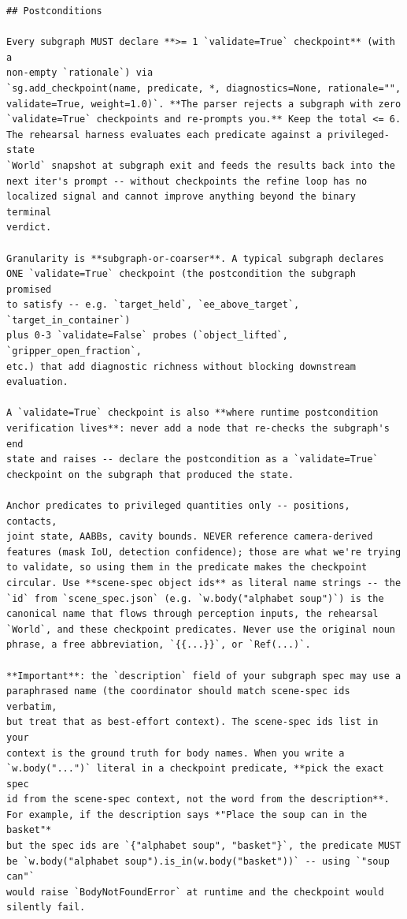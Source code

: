 \begin{lstlisting}
## Postconditions

Every subgraph MUST declare **>= 1 `validate=True` checkpoint** (with a
non-empty `rationale`) via
`sg.add_checkpoint(name, predicate, *, diagnostics=None, rationale="",
validate=True, weight=1.0)`. **The parser rejects a subgraph with zero
`validate=True` checkpoints and re-prompts you.** Keep the total <= 6.
The rehearsal harness evaluates each predicate against a privileged-state
`World` snapshot at subgraph exit and feeds the results back into the
next iter's prompt -- without checkpoints the refine loop has no
localized signal and cannot improve anything beyond the binary terminal
verdict.

Granularity is **subgraph-or-coarser**. A typical subgraph declares
ONE `validate=True` checkpoint (the postcondition the subgraph promised
to satisfy -- e.g. `target_held`, `ee_above_target`, `target_in_container`)
plus 0-3 `validate=False` probes (`object_lifted`, `gripper_open_fraction`,
etc.) that add diagnostic richness without blocking downstream evaluation.

A `validate=True` checkpoint is also **where runtime postcondition
verification lives**: never add a node that re-checks the subgraph's end
state and raises -- declare the postcondition as a `validate=True`
checkpoint on the subgraph that produced the state.

Anchor predicates to privileged quantities only -- positions, contacts,
joint state, AABBs, cavity bounds. NEVER reference camera-derived
features (mask IoU, detection confidence); those are what we're trying
to validate, so using them in the predicate makes the checkpoint
circular. Use **scene-spec object ids** as literal name strings -- the
`id` from `scene_spec.json` (e.g. `w.body("alphabet soup")`) is the
canonical name that flows through perception inputs, the rehearsal
`World`, and these checkpoint predicates. Never use the original noun
phrase, a free abbreviation, `{{...}}`, or `Ref(...)`.

**Important**: the `description` field of your subgraph spec may use a
paraphrased name (the coordinator should match scene-spec ids verbatim,
but treat that as best-effort context). The scene-spec ids list in your
context is the ground truth for body names. When you write a
`w.body("...")` literal in a checkpoint predicate, **pick the exact spec
id from the scene-spec context, not the word from the description**.
For example, if the description says *"Place the soup can in the basket"*
but the spec ids are `{"alphabet soup", "basket"}`, the predicate MUST
be `w.body("alphabet soup").is_in(w.body("basket"))` -- using `"soup can"`
would raise `BodyNotFoundError` at runtime and the checkpoint would
silently fail.


\end{lstlisting}
